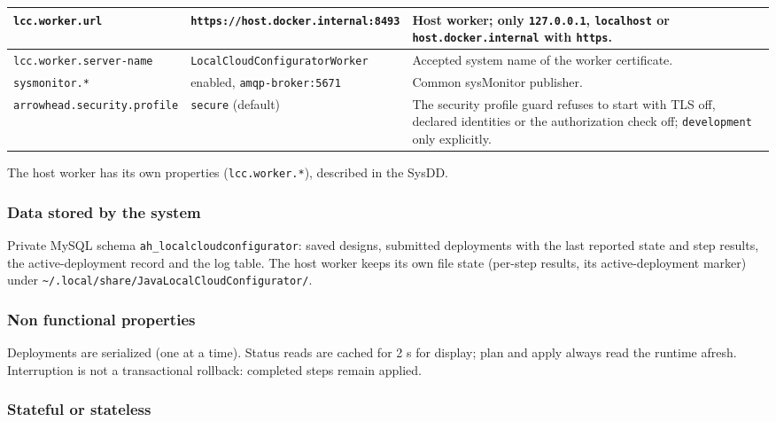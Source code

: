 \documentclass[a4paper]{arrowhead}
\begin{document}
\begin{longtable}{| >{\raggedright\arraybackslash}p{5.0cm} | >{\raggedright\arraybackslash}p{3.8cm} | >{\raggedright\arraybackslash}p{6.0cm} |}
\texttt{lcc.\allowbreak{}worker.\allowbreak{}url} & \texttt{https:\allowbreak{}/\allowbreak{}/\allowbreak{}host.\allowbreak{}docker.\allowbreak{}internal:\allowbreak{}8493} & Host worker; only \texttt{127.0.0.1}, \texttt{localhost} or \texttt{host.\allowbreak{}docker.\allowbreak{}internal} with \texttt{https}. \\ \hline
\texttt{lcc.\allowbreak{}worker.\allowbreak{}server-\allowbreak{}name} & \texttt{LocalCloud\allowbreak{}Configurator\allowbreak{}Worker} & Accepted system name of the worker certificate. \\ \hline
\texttt{sysmonitor.\allowbreak{}*} & enabled, \texttt{amqp-\allowbreak{}broker:\allowbreak{}5671} & Common sysMonitor publisher. \\ \hline
\texttt{arrowhead.\allowbreak{}security.\allowbreak{}profile} & \texttt{secure} (default) & The security profile guard refuses to start with TLS off, declared identities or the authorization check off; \texttt{development} only explicitly. \\ \hline
\end{longtable}

The host worker has its own properties (\texttt{lcc.\allowbreak{}worker.\allowbreak{}*}), described in the SysDD.

\subsubsection{Data stored by the system}

Private MySQL schema \texttt{ah\_\allowbreak{}localcloudconfigurator}: saved designs, submitted deployments with the last reported state and step results, the active-deployment record and the log table. The host worker keeps its own file state (per-step results, its active-deployment marker) under \texttt{\textasciitilde/\allowbreak{}.local/\allowbreak{}share/\allowbreak{}JavaLocalCloudConfigurator/}.

\subsubsection{Non functional properties}

Deployments are serialized (one at a time). Status reads are cached for 2 s for display; plan and apply always read the runtime afresh. Interruption is not a transactional rollback: completed steps remain applied.

\subsubsection{Stateful or stateless}
\end{document}
